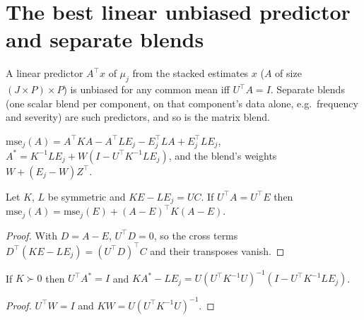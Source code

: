 \section*{The best linear unbiased predictor and separate blends}

A linear predictor $A^\top x$ of $\mu_j$ from the stacked estimates $x$ ($A$ of size
$(J \times P) \times P$) is unbiased for any common mean iff $U^\top A = I$. Separate blends
(one scalar blend per component, on that component's data alone, e.g.\ frequency and
severity) are such predictors, and so is the matrix blend.

\begin{definition}\label{def:CV_blup}
  \leanok
  $\mathrm{mse}_j(A) = A^\top KA - A^\top LE_j - E_j^\top LA + E_j^\top LE_j$,
  $A^\ast = K^{-1}LE_j + W(I - U^\top K^{-1}LE_j)$, and the blend's weights
  $W + (E_j - W)Z^\top$.
\end{definition}

\begin{lemma}\label{lem:CV_linMse_pythagoras}
  \leanok
  Let $K$, $L$ be symmetric and $KE - LE_j = UC$. If $U^\top A = U^\top E$ then
  $\mathrm{mse}_j(A) = \mathrm{mse}_j(E) + (A-E)^\top K(A-E)$.
\end{lemma}
\begin{proof}
  \leanok
  With $D = A - E$, $U^\top D = 0$, so the cross terms
  $D^\top(KE - LE_j) = (U^\top D)^\top C$ and their transposes vanish.
\end{proof}

\begin{lemma}\label{lem:CV_blup_foc}
  \leanok
  If $K \succ 0$ then $U^\top A^\ast = I$ and
  $KA^\ast - LE_j = U(U^\top K^{-1}U)^{-1}(I - U^\top K^{-1}LE_j)$.
\end{lemma}
\begin{proof}
  \leanok
  $U^\top W = I$ and $KW = U(U^\top K^{-1}U)^{-1}$.
\end{proof}


